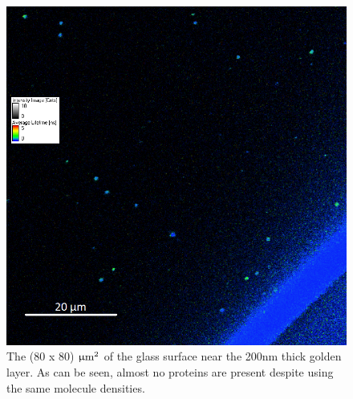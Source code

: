 \documentclass[twoside,single]{lion-msc}
\begin{document}
\begin{enumerate}
\begin{figure}[ht!]
\centering
\includegraphics[width=\textwidth]{no_prot}
\caption{The (80 x 80) $\upmu \textup{m}^{2}$ of the glass surface near the 200nm thick golden layer. As can be seen, almost no proteins are present despite using the same molecule densities.}
\label{no_prot}
\end{figure}

\end{enumerate}
\end{document}
